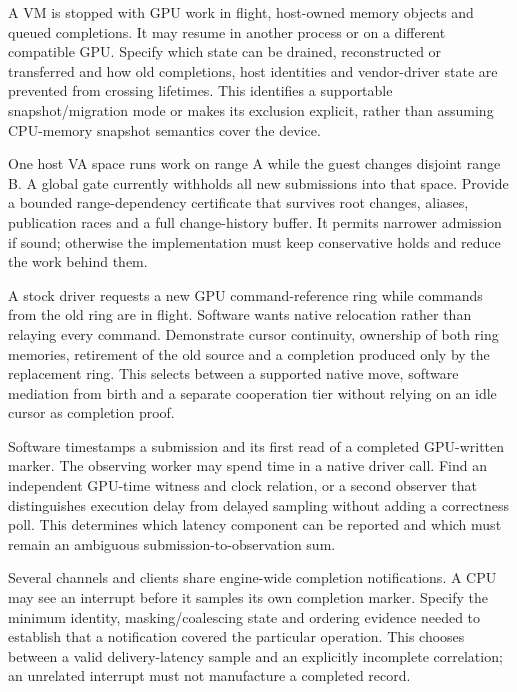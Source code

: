 {A VM is stopped with GPU work in flight, host-owned memory objects and queued completions. It may
resume in another process or on a different compatible GPU.}
{Specify which state can be drained, reconstructed or transferred and how old completions, host
identities and vendor-driver state are prevented from crossing lifetimes.}
{This identifies a supportable snapshot/migration mode or makes its exclusion explicit, rather
than assuming CPU-memory snapshot semantics cover the device.}
\label{q:snapshot}

{One host VA space runs work on range A while the guest changes disjoint range B. A global gate
currently withholds all new submissions into that space.}
{Provide a bounded range-dependency certificate that survives root changes, aliases, publication
races and a full change-history buffer.}
{It permits narrower admission if sound; otherwise the implementation must keep conservative holds
and reduce the work behind them.}
\label{q:range}

{A stock driver requests a new GPU command-reference ring while commands from the old ring are in
flight. Software wants native relocation rather than relaying every command.}
{Demonstrate cursor continuity, ownership of both ring memories, retirement of the old source and
a completion produced only by the replacement ring.}
{This selects between a supported native move, software mediation from birth and a separate
cooperation tier without relying on an idle cursor as completion proof.}
\label{q:relocate}

{Software timestamps a submission and its first read of a completed GPU-written marker. The
observing worker may spend time in a native driver call.}
{Find an independent GPU-time witness and clock relation, or a second observer that distinguishes
execution delay from delayed sampling without adding a correctness poll.}
{This determines which latency component can be reported and which must remain an ambiguous
submission-to-observation sum.}
\label{q:clock}

{Several channels and clients share engine-wide completion notifications. A CPU may see an
interrupt before it samples its own completion marker.}
{Specify the minimum identity, masking/coalescing state and ordering evidence needed to establish
that a notification covered the particular operation.}
{This chooses between a valid delivery-latency sample and an explicitly incomplete correlation; an
unrelated interrupt must not manufacture a completed record.}
\label{q:interrupt}

